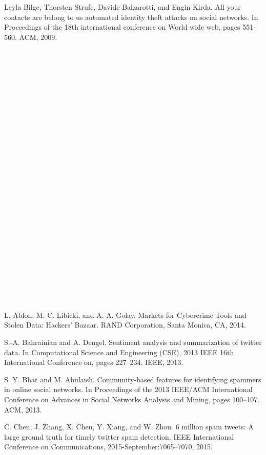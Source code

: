 \documentclass[conference]{IEEEtran}
\begin{document}
\begin{enumerate}[label={[\arabic*]}]
\item Leyla Bilge, Thorsten Strufe, Davide Balzarotti, and
Engin Kirda. All your contacts are belong to us
automated identity theft attacks on social networks. In
Proceedings of the 18th international conference on
World wide web, pages 551–560. ACM, 2009.\\\\\\\\\\\\\\\\\\\\\\\\\\\\\\\\\\\\\\\\\\\\\\\\\\\\\\
\item L. Ablon, M. C. Libicki, and A. A. Golay. Markets
for Cybercrime Tools and Stolen Data: Hackers’
Bazaar. RAND Corporation, Santa Monica, CA,
2014.
\item S.-A. Bahrainian and A. Dengel. Sentiment analysis
and summarization of twitter data. In Computational
Science and Engineering (CSE), 2013 IEEE 16th
International Conference on, pages 227–234. IEEE,
2013.
\item S. Y. Bhat and M. Abulaish. Community-based
features for identifying spammers in online social
networks. In Proceedings of the 2013 IEEE/ACM
International Conference on Advances in Social Networks Analysis and Mining, pages 100–107. ACM,
2013.
\item C. Chen, J. Zhang, X. Chen, Y. Xiang, and
W. Zhou. 6 million spam tweets: A large ground
truth for timely twitter spam detection. IEEE
International Conference on Communications,
2015-September:7065–7070, 2015.

\end{enumerate}
\end{document}
